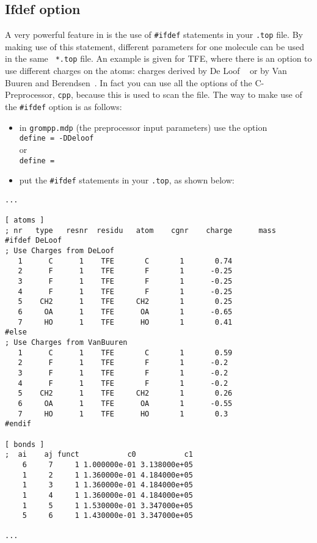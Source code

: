 \subsection{Ifdef option}
\label{subsec:ifdef}
A very powerful feature in {\gromacs} is the use of {\tt \#ifdef}
statements in your {\tt *.top} file. By making use of this statement,
different parameters for one molecule can be used in the same {\tt
*.top} file. An example is given for TFE, where there is an option to
use different charges on the atoms: charges derived by De Loof
{\etal}~\cite{Loof92} or by Van Buuren and
Berendsen~\cite{Buuren93a}. In fact you can use all the options of the
C-Preprocessor, {\tt cpp}, because this is used to scan the file.  The
way to make use of the {\tt \#ifdef} option is as follows:
\begin{itemize}
\item in {\tt grompp.mdp} (the {\gromacs} preprocessor input
      parameters) use the option\\{\tt define = -DDeloof}\\ or
      \\{\tt define = }
\item put the {\tt \#ifdef} statements in your {\tt *.top}, as
      shown below: 
\end{itemize}
{\small\begin{verbatim}
...

[ atoms ]
; nr   type   resnr  residu   atom    cgnr    charge      mass
#ifdef DeLoof
; Use Charges from DeLoof
   1      C      1    TFE       C       1       0.74
   2      F      1    TFE       F       1      -0.25
   3      F      1    TFE       F       1      -0.25
   4      F      1    TFE       F       1      -0.25
   5    CH2      1    TFE     CH2       1       0.25
   6     OA      1    TFE      OA       1      -0.65
   7     HO      1    TFE      HO       1       0.41
#else
; Use Charges from VanBuuren
   1      C      1    TFE       C       1       0.59
   2      F      1    TFE       F       1      -0.2
   3      F      1    TFE       F       1      -0.2
   4      F      1    TFE       F       1      -0.2
   5    CH2      1    TFE     CH2       1       0.26
   6     OA      1    TFE      OA       1      -0.55
   7     HO      1    TFE      HO       1       0.3
#endif

[ bonds ]
;  ai    aj funct           c0           c1
    6     7     1 1.000000e-01 3.138000e+05 
    1     2     1 1.360000e-01 4.184000e+05 
    1     3     1 1.360000e-01 4.184000e+05 
    1     4     1 1.360000e-01 4.184000e+05 
    1     5     1 1.530000e-01 3.347000e+05 
    5     6     1 1.430000e-01 3.347000e+05 

...
\end{verbatim}}

